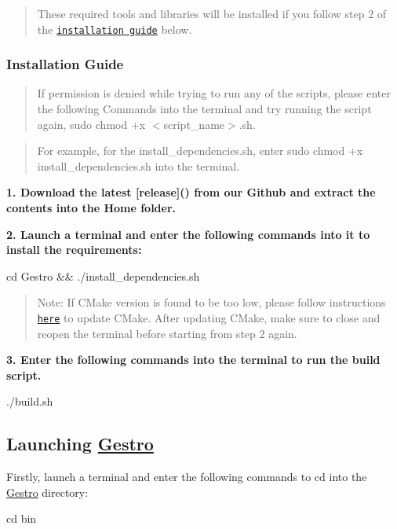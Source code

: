 \begin{quote}
These required tools and libraries will be installed if you follow step 2 of the \href{#installation-guide}{\tt installation guide} below. \end{quote}


\subsubsection*{Installation Guide}

\begin{quote}
If permission is denied while trying to run any of the scripts, please enter the following Commands into the terminal and try running the script again, {\ttfamily sudo chmod +x $<$script\+\_\+name$>$.sh}. \end{quote}


\begin{quote}
For example, for the install\+\_\+dependencies.\+sh, enter {\ttfamily sudo chmod +x install\+\_\+dependencies.\+sh} into the terminal. \end{quote}


{\bfseries 1. Download the latest \mbox{[}release\mbox{]}() from our Github and extract the contents into the Home folder.}

{\bfseries 2. Launch a terminal and enter the following commands into it to install the requirements\+:} 
\begin{DoxyCode}
cd Gestro && ./install\_dependencies.sh
\end{DoxyCode}
 \begin{quote}
Note\+: If C\+Make version is found to be too low, please follow instructions \href{https://askubuntu.com/a/829311}{\tt here} to update C\+Make. After updating C\+Make, make sure to close and reopen the terminal before starting from step 2 again. \end{quote}


{\bfseries 3. Enter the following commands into the terminal to run the build script.} 
\begin{DoxyCode}
./build.sh
\end{DoxyCode}


\subsection*{Launching \hyperlink{namespace_gestro}{Gestro}}

Firstly, launch a terminal and enter the following commands to cd into the \hyperlink{namespace_gestro}{Gestro} directory\+: 
\begin{DoxyCode}
cd bin
\end{DoxyCode}


